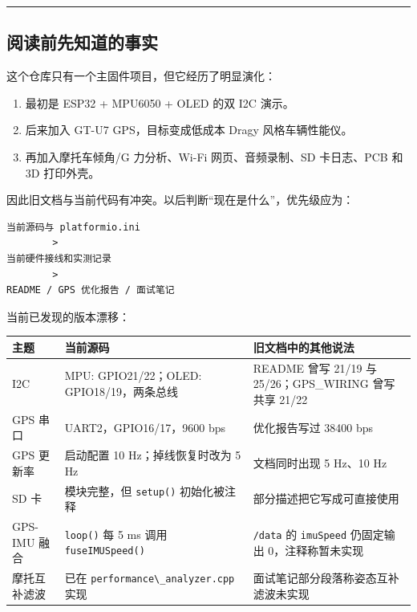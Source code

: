 \documentclass[
  UTF8,11pt,a4paper]{ctexart}
\newcommand{\passthrough}[1]{#1}
\newcounter{none} %
\providecommand{\tightlist}{%
  \setlength{\itemsep}{0pt}\setlength{\parskip}{0pt}}
\begin{document}
\begin{center}\rule{0.5\linewidth}{0.5pt}\end{center}

\subsection{阅读前先知道的事实}\label{ux9605ux8bfbux524dux5148ux77e5ux9053ux7684ux4e8bux5b9e}

这个仓库只有一个主固件项目，但它经历了明显演化：

\begin{enumerate}
\def\labelenumi{\arabic{enumi}.}
\tightlist
\item
  最初是 ESP32 + MPU6050 + OLED 的双 I2C 演示。
\item
  后来加入 GT-U7 GPS，目标变成低成本 Dragy 风格车辆性能仪。
\item
  再加入摩托车倾角/G 力分析、Wi-Fi 网页、音频录制、SD 卡日志、PCB 和 3D
  打印外壳。
\end{enumerate}

因此旧文档与当前代码有冲突。以后判断``现在是什么''，优先级应为：

\begin{lstlisting}
当前源码与 platformio.ini
        >
当前硬件接线和实测记录
        >
README / GPS 优化报告 / 面试笔记
\end{lstlisting}

当前已发现的版本漂移：

{\def\LTcaptype{none} %
\begin{longtable}[]{@{}lll@{}}
\toprule\noalign{}
主题 & 当前源码 & 旧文档中的其他说法 \\
\midrule\noalign{}
\endhead
\bottomrule\noalign{}
\endlastfoot
I2C & MPU: GPIO21/22；OLED: GPIO18/19，两条总线 & README 曾写 21/19 与
25/26；GPS\_WIRING 曾写共享 21/22 \\
GPS 串口 & UART2，GPIO16/17，9600 bps & 优化报告写过 38400 bps \\
GPS 更新率 & 启动配置 10 Hz；掉线恢复时改为 5 Hz & 文档同时出现 5 Hz、10
Hz \\
SD 卡 & 模块完整，但 \passthrough{\lstinline!setup()!} 初始化被注释 &
部分描述把它写成可直接使用 \\
GPS-IMU 融合 & \passthrough{\lstinline!loop()!} 每 5 ms 调用
\passthrough{\lstinline!fuseIMUSpeed()!} &
\passthrough{\lstinline!/data!} 的 \passthrough{\lstinline!imuSpeed!}
仍固定输出 0，注释称暂未实现 \\
摩托互补滤波 & 已在 \passthrough{\lstinline!performance\_analyzer.cpp!}
实现 & 面试笔记部分段落称姿态互补滤波未实现 \\
\end{longtable}
}
\end{document}
